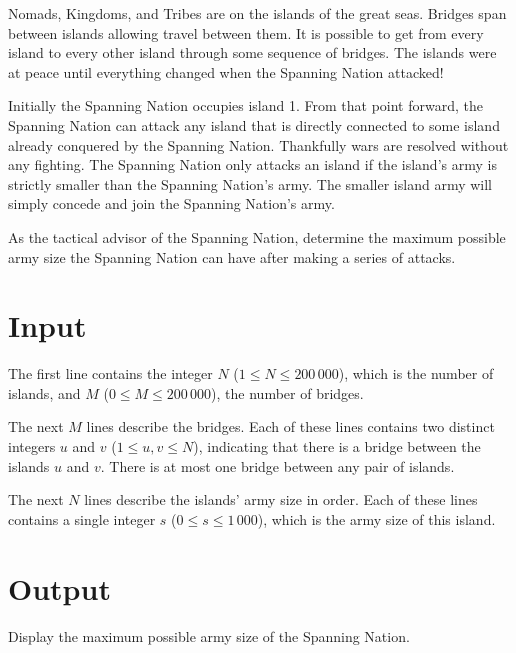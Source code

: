 
Nomads, Kingdoms, and Tribes are on the islands of the great seas.
Bridges span between islands allowing travel between them.
It is possible to get from every island to every other island
through some sequence of bridges.
The islands were at peace until everything changed when the
Spanning Nation attacked!

Initially the Spanning Nation occupies island 1.  From that point
forward, the Spanning Nation can attack any island that is directly
connected to some island already conquered by the
Spanning Nation.  Thankfully wars are resolved without any fighting.
The Spanning Nation only attacks an island if the island's army is
strictly smaller than the Spanning Nation's army.  The smaller island
army will simply concede and join the Spanning Nation's army.

As the tactical advisor of the Spanning Nation, determine the maximum
possible army size the Spanning Nation can have after making a series
of attacks.

\section*{Input}

The first line contains the integer $N$ ($1 \leq N \leq 200\,000$),
which is the number of islands, and $M$ ($0 \leq M \leq 200\,000$),
the number of bridges.

The next $M$ lines describe the bridges. Each of these lines contains
two distinct integers $u$ and $v$ ($1 \leq u, v \leq N$), indicating
that there is a bridge between the islands $u$ and $v$.  There is at
most one bridge between any pair of islands.

The next $N$ lines describe the islands' army size in order. Each of these
lines contains a single integer $s$ ($0 \leq s \leq 1\,000$), which is the
army size of this island.

\section*{Output}

Display the maximum possible army size of the Spanning Nation.

